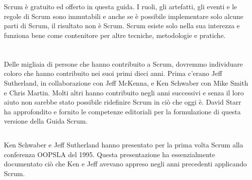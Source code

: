 
\section*{\color{Blue}{Conclusioni}}%
\label{sec:conclusion}
Scrum è gratuito ed offerto in questa guida. I ruoli, gli artefatti, gli eventi e le regole di Scrum sono immutabili e anche se \`e 
possibile implementare solo alcune parti di Scrum, il risultato non \`e Scrum. Scrum esiste solo nella sua interezza e funziona bene come 
contenitore per altre tecniche, metodologie e pratiche.

\section*{\color{Blue}{Ringraziamenti}}%
\label{sec:acknowledgements}

\subsection*{\color{SteelBlue}{Persone}}%
\label{sec:people}
Delle migliaia di persone che hanno contribuito a Scrum, dovremmo individuare coloro che hanno contribuito nei suoi
primi dieci anni. Prima c'erano Jeff Sutherland, in collaborazione con Jeff McKenna, e Ken Schwaber con Mike Smith e
Chris Martin. Molti altri hanno contribuito negli anni successivi e senza il loro aiuto non sarebbe stato possibile ridefinire 
Scrum in ci\`o che oggi \`e. David Starr ha approfondito e fornito le competenze editoriali per la formulazione di questa 
versione della Guida Scrum.

\subsection*{\color{SteelBlue}{Storia}}%
\label{sec:history}
Ken Schwaber e Jeff Sutherland hanno presentato per la prima volta Scrum alla conferenza OOPSLA del 1995. Questa presentazione 
ha essenzialmente documentato ci\`o che Ken e Jeff avevano appreso negli anni precedenti applicando Scrum. \newline

